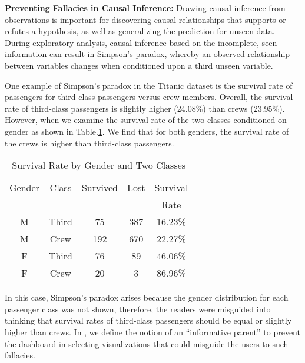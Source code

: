 \textbf{Preventing Fallacies in Causal Inference:} Drawing causal inference from observations is important for discovering causal relationships that supports or refutes a hypothesis, as well as generalizing the prediction for unseen data. During exploratory analysis, causal inference based on the incomplete, seen information can result in Simpson's paradox, whereby an observed relationship between variables changes when conditioned upon a third unseen variable.  
\par One example of Simpson's paradox in the Titanic dataset is the survival rate of passengers for third-class passengers versus crew members. Overall, the survival rate of third-class passengers is slightly higher (24.08\%) than crews (23.95\%). However, when we examine the survival rate of the two classes conditioned on gender as shown in Table.\ref{tab:t2}. We find that for both genders, the survival rate of the crews is higher than third-class passengers.  
\begin{table}[thb]
	\caption{Survival Rate by Gender and Two Classes}
    \label{tab:t2}
	\begin{center}    
	\begin{tabular}{ccccc}
	\toprule
	Gender & Class & Survived & Lost & Survival\\
	& & & & Rate\\
	\midrule
	M & Third & 75 & 387 & 16.23\%\\ 
	M & Crew & 192 & 670 & 22.27\%\\ 
	\bottomrule
    F & Third & 76 & 89 & 46.06\%\\ 
	F & Crew & 20 & 3 & 86.96\%\\ 
	\bottomrule
	\end{tabular}
    \end{center}
\end{table}
In this case, Simpson's paradox arises because the gender distribution for each passenger class was not shown, therefore, the readers were misguided into thinking that survival rates of third-class passengers should be equal or slightly higher than crews.
In \system, we define the notion of an ``informative parent'' to prevent the dashboard in selecting visualizations that could misguide the users to such fallacies. 

